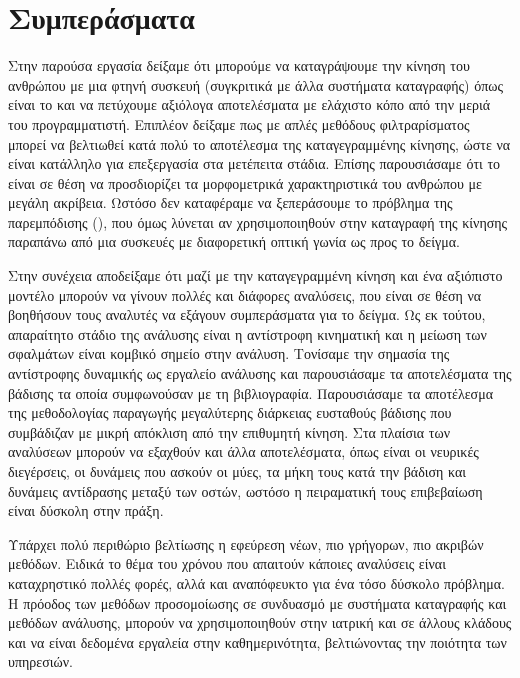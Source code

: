 \vfill

\section{Συμπεράσματα}

Στην παρούσα εργασία δείξαμε ότι μπορούμε να καταγράψουμε την κίνηση του ανθρώπου με μια φτηνή συσκευή (συγκριτικά με άλλα συστήματα καταγραφής) όπως είναι το  και να πετύχουμε αξιόλογα αποτελέσματα με ελάχιστο κόπο από την μεριά του προγραμματιστή. Επιπλέον δείξαμε πως με απλές μεθόδους φιλτραρίσματος μπορεί να βελτιωθεί κατά πολύ το αποτέλεσμα της καταγεγραμμένης κίνησης, ώστε να είναι κατάλληλο για επεξεργασία στα μετέπειτα στάδια. Επίσης παρουσιάσαμε ότι το  είναι σε θέση να προσδιορίζει τα μορφομετρικά χαρακτηριστικά του ανθρώπου με μεγάλη ακρίβεια. Ωστόσο δεν καταφέραμε να ξεπεράσουμε το πρόβλημα της παρεμπόδισης (), που όμως λύνεται αν χρησιμοποιηθούν στην καταγραφή της κίνησης παραπάνω από μια συσκευές με διαφορετική οπτική γωνία ως προς το δείγμα.

Στην συνέχεια αποδείξαμε ότι μαζί με την καταγεγραμμένη κίνηση και ένα αξιόπιστο μοντέλο μπορούν να γίνουν πολλές και διάφορες αναλύσεις, που είναι σε θέση να βοηθήσουν τους αναλυτές να εξάγουν συμπεράσματα για το δείγμα. Ως εκ τούτου, απαραίτητο στάδιο της ανάλυσης είναι η αντίστροφη κινηματική και η μείωση των σφαλμάτων είναι κομβικό σημείο στην ανάλυση. Τονίσαμε την σημασία της αντίστροφης δυναμικής ως εργαλείο ανάλυσης και παρουσιάσαμε τα αποτελέσματα της βάδισης τα οποία συμφωνούσαν με τη βιβλιογραφία. Παρουσιάσαμε τα αποτέλεσμα της μεθοδολογίας παραγωγής μεγαλύτερης διάρκειας ευσταθούς βάδισης που συμβάδιζαν με μικρή απόκλιση από την επιθυμητή κίνηση. Στα πλαίσια των αναλύσεων μπορούν να εξαχθούν και άλλα αποτελέσματα, όπως είναι οι νευρικές διεγέρσεις, οι δυνάμεις που ασκούν οι μύες, τα μήκη τους κατά την βάδιση και δυνάμεις αντίδρασης μεταξύ των οστών, ωστόσο η πειραματική τους επιβεβαίωση είναι δύσκολη στην πράξη.

Υπάρχει πολύ περιθώριο βελτίωσης η εφεύρεση νέων, πιο γρήγορων, πιο ακριβών μεθόδων. Ειδικά το θέμα του χρόνου που απαιτούν κάποιες αναλύσεις είναι καταχρηστικό πολλές φορές, αλλά και αναπόφευκτο για ένα τόσο δύσκολο πρόβλημα. Η πρόοδος των μεθόδων προσομοίωσης σε συνδυασμό με συστήματα καταγραφής και μεθόδων ανάλυσης, μπορούν να χρησιμοποιηθούν στην ιατρική και σε άλλους κλάδους και να είναι δεδομένα εργαλεία στην καθημερινότητα, βελτιώνοντας την ποιότητα των υπηρεσιών.
